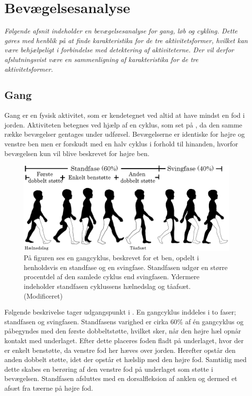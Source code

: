 \section{Bevægelsesanalyse} \label{bevaegelse}
\textit{Følgende afsnit indeholder en bevægelsesanalyse for gang, løb og cykling. Dette gøres med henblik på at finde karakteristika for de tre aktivitetsformer, hvilket kan være behjælpeligt i forbindelse med detektering af aktiviteterne. Der vil derfor afslutningsvist være en sammenligning af karakteristika for de tre aktivitetsformer.}

\subsection{Gang}
Gang er en fysisk aktivitet, som er kendetegnet ved altid at have mindst en fod i jorden. Aktiviteten betegnes ved hjælp af en cyklus, som set på , da den samme række bevægelser gentages under udførsel. Bevægelserne er identiske for højre og venstre ben men er forskudt med en halv cyklus i forhold til hinanden, hvorfor bevægelsen kun vil blive beskrevet for højre ben. \citep{VaughanDavisOConnor1992,Whittle1990} 
\begin{figure}[H]
	\centering
	\includegraphics[scale=0.7]{figures/bProblemloesning/gang_cyklus.png}
	\caption{På figuren ses en gangcyklus, beskrevet for et ben, opdelt i henholdsvis en standfase og en svingfase. Standfasen udgør en større procentdel af den samlede cyklus end svingfasen. Ydermere indeholder standfasen cyklussens hælnedslag og tåafsæt. \citep{VaughanDavisOConnor1992} (Modificeret)}
	\label{fig:gang_cyklus}
\end{figure}
Følgende beskrivelse tager udgangspunkt i . En gangcyklus inddeles i to faser; standfasen og svingfasen. Standfasens varighed er cirka 60\% af én gangcyklus og påbegyndes med den første dobbeltstøtte, hvilket sker, når den højre hæl opnår kontakt med underlaget. Efter dette placeres foden fladt på underlaget, hvor der er enkelt benstøtte, da venstre fod her hæves over jorden. Herefter opstår den anden dobbelt støtte, idet der opstår et hælslip med den højre fod. Samtidig med dette skabes en berøring af den venstre fod på underlaget som støtte i bevægelsen. Standfasen afsluttes med en dorsalfleksion af anklen og dermed et afsæt fra tæerne på højre fod. \citep{VaughanDavisOConnor1992,Whittle1990}  \newline 
